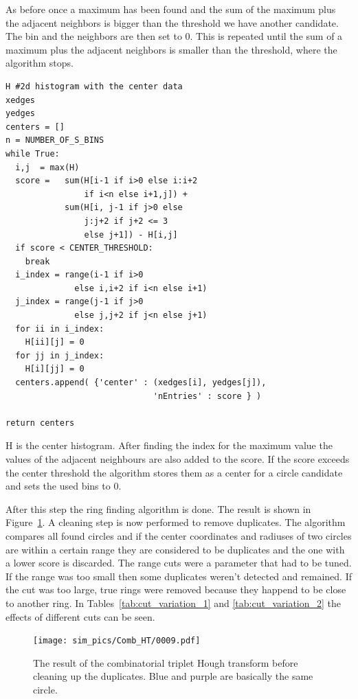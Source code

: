 \documentclass[11pt,twoside]{scrreprt}
\begin{document}
As before once a maximum has been found and the sum of the maximum plus the adjacent neighbors is bigger than the threshold we have another
candidate. The bin and the neighbors are then set to 0. This is repeated until the sum of a maximum plus the adjacent neighbors is smaller
than the threshold, where the algorithm stops.
\begin{codesnippet}
  \begin{lstlisting}
H #2d histogram with the center data
xedges 
yedges 
centers = []
n = NUMBER_OF_S_BINS
while True:
  i,j  = max(H)
  score =   sum(H[i-1 if i>0 else i:i+2 
                if i<n else i+1,j]) + 
            sum(H[i, j-1 if j>0 else
                j:j+2 if j+2 <= 3 
                else j+1]) - H[i,j]
  if score < CENTER_THRESHOLD:
    break
  i_index = range(i-1 if i>0 
              else i,i+2 if i<n else i+1)
  j_index = range(j-1 if j>0 
              else j,j+2 if j<n else j+1)
  for ii in i_index:
    H[ii][j] = 0  
  for jj in j_index:
    H[i][jj] = 0
  centers.append( {'center' : (xedges[i], yedges[j]), 
                              'nEntries' : score } )

return centers
\end{lstlisting}
\caption[Center coordinate extraction]{H is the center histogram. After finding the index for the maximum value the values of the 
adjacent neighbours are also added to the score. If the score exceeds the center threshold the algorithm stores them as a center for
a circle candidate and sets the used bins to 0.}
\end{codesnippet}


After this step the ring finding algorithm is done. The result is shown in Figure~\ref{fig:comb_ht_0009}. A cleaning step is now performed
to remove duplicates.
The algorithm compares all found circles and if the center coordinates and radiuses of two circles are within a certain range they 
are considered to be duplicates and the one with a lower score is discarded. The range cuts were a parameter that had to be tuned. If the 
range was too small then some duplicates weren't detected and remained. If the cut was too large, true rings were removed because they
happend to be close to another ring. In Tables~\ref{tab:cut_variation_1} and \ref{tab:cut_variation_2} the effects of different
cuts can be seen.


\begin{figure}[htb]
  \centering
  \texttt{[image: sim\_pics/Comb\_HT/0009.pdf]}
  \caption{The result of the combinatorial triplet Hough transform before cleaning up the duplicates. Blue and purple are basically the same circle.}
  \label{fig:comb_ht_0009}
\end{figure}
\end{document}
